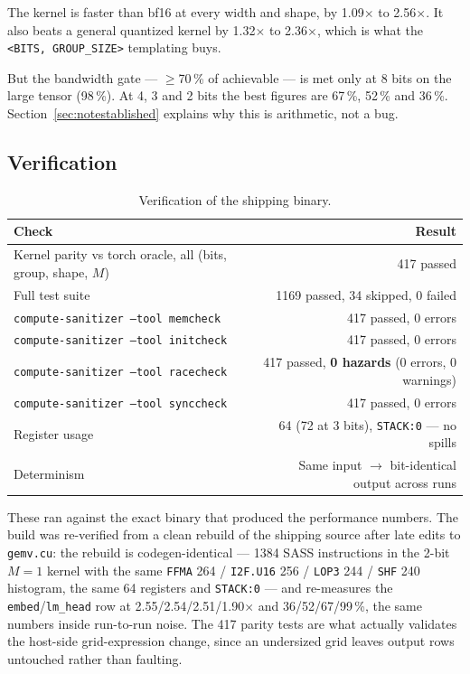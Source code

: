 \documentclass[11pt]{article}
\newcommand{\x}{$\times$}
\newcommand{\pct}{\,\%}
\newcommand{\code}[1]{\texttt{#1}}
\begin{document}
The kernel is faster than bf16 at every width and shape, by 1.09\x{} to 2.56\x. It also beats a
general quantized kernel by 1.32\x{} to 2.36\x, which is what the \code{<BITS, GROUP\_SIZE>}
templating buys.

But the bandwidth gate --- $\ge$70\pct{} of achievable --- is met only at 8 bits on the large
tensor (98\pct). At 4, 3 and 2 bits the best figures are 67\pct, 52\pct{} and 36\pct.
Section~\ref{sec:notestablished} explains why this is arithmetic, not a bug.

\subsection{Verification}

\begin{table}[H]
\centering\small
\caption{Verification of the shipping binary.}
\begin{tabular}{lr}
\toprule
Check & Result \\
\midrule
Kernel parity vs torch oracle, all (bits, group, shape, $M$) & 417 passed \\
\rowcolor{rowtint}
Full test suite & 1169 passed, 34 skipped, 0 failed \\
\code{compute-sanitizer --tool memcheck} & 417 passed, 0 errors \\
\rowcolor{rowtint}
\code{compute-sanitizer --tool initcheck} & 417 passed, 0 errors \\
\code{compute-sanitizer --tool racecheck} & 417 passed, \textbf{0 hazards} (0 errors, 0 warnings) \\
\rowcolor{rowtint}
\code{compute-sanitizer --tool synccheck} & 417 passed, 0 errors \\
Register usage & 64 (72 at 3 bits), \code{STACK:0} --- no spills \\
\rowcolor{rowtint}
Determinism & Same input $\to$ bit-identical output across runs \\
\bottomrule
\end{tabular}
\end{table}

These ran against the exact binary that produced the performance numbers. The build was
re-verified from a clean rebuild of the shipping source after late edits to \code{gemv.cu}: the
rebuild is codegen-identical --- 1384 SASS instructions in the 2-bit $M=1$ kernel with the same
\code{FFMA} 264 / \code{I2F.U16} 256 / \code{LOP3} 244 / \code{SHF} 240 histogram, the same 64
registers and \code{STACK:0} --- and re-measures the \code{embed}/\code{lm\_head} row at
2.55/2.54/2.51/1.90\x{} and 36/52/67/99\pct, the same numbers inside run-to-run noise. The 417
parity tests are what actually validates the host-side grid-expression change, since an undersized
grid leaves output rows untouched rather than faulting.
\end{document}
